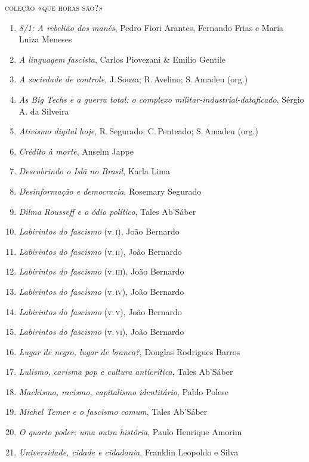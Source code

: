 \medskip
{\large\textsc{coleção «que horas são?»}}

\begin{enumerate}
\setlength\parskip{4.2pt}
\setlength\itemsep{-1.4mm}
\item \textit{8/1: A rebelião dos manés}, Pedro Fiori Arantes, Fernando Frias e Maria Luiza Meneses
\item \textit{A linguagem fascista}, Carlos Piovezani \& Emilio Gentile
\item \textit{A sociedade de controle}, J.\,Souza; R.\,Avelino; S.\,Amadeu (org.)
\item \textit{As Big Techs e a guerra total: o complexo militar-industrial-dataficado}, Sérgio A. da Silveira
\item \textit{Ativismo digital hoje}, R.\,Segurado; C.\,Penteado; S.\,Amadeu (org.)
\item \textit{Crédito à morte}, Anselm Jappe
\item \textit{Descobrindo o Islã no Brasil}, Karla Lima
\item \textit{Desinformação e democracia}, Rosemary Segurado
\item \textit{Dilma Rousseff e o ódio político}, Tales Ab'Sáber
\item \textit{Labirintos do fascismo} (v.\,\textsc{i}), João Bernardo
\item \textit{Labirintos do fascismo} (v.\,\textsc{ii}), João Bernardo
\item \textit{Labirintos do fascismo} (v.\,\textsc{iii}), João Bernardo
\item \textit{Labirintos do fascismo} (v.\,\textsc{iv}), João Bernardo
\item \textit{Labirintos do fascismo} (v.\,\textsc{v}), João Bernardo
\item \textit{Labirintos do fascismo} (v.\,\textsc{vi}), João Bernardo
\item \textit{Lugar de negro, lugar de branco?}, Douglas Rodrigues Barros
\item \textit{Lulismo, carisma pop e cultura anticrítica}, Tales Ab'Sáber
\item \textit{Machismo, racismo, capitalismo identitário}, Pablo Polese
\item \textit{Michel Temer e o fascismo comum}, Tales Ab'Sáber
\item \textit{O quarto poder: uma outra história}, Paulo Henrique Amorim
\item \textit{Universidade, cidade e cidadania}, Franklin Leopoldo e Silva
\end{enumerate}

